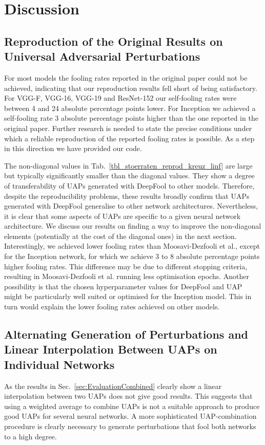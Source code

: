 \documentclass[runningheads]{llncs}
\begin{document}
\section{Discussion}\label{sec:Discussion}
\subsection{Reproduction of the Original Results on Universal Adversarial Perturbations}
For most models the fooling rates reported in the original paper could not be achieved, indicating that our reproduction results fell short of being satisfactory. For VGG-F, VGG-16, VGG-19 and ResNet-152 our self-fooling rates were between 4 and 24 absolute percentage points lower. For Inception we achieved a self-fooling rate 3 absolute percentage points higher than the one reported in the original paper. Further research is needed to state the precise conditions under which a reliable reproduction of the reported fooling rates is possible. As a step in this direction we have provided our code.

The non-diagonal values in Tab.~\ref{tbl_stoerraten_reprod_kreuz_linf} are large but typically significantly smaller than the diagonal values. They show a degree of transferability of UAPs generated with DeepFool to other models. Therefore, despite the reproducibility problems, these results broadly confirm that UAPs generated with DeepFool generalise to other network architectures. Nevertheless, it is clear that some aspects of UAPs are specific to a given neural network architecture. We discuss our results on finding a way to improve the non-diagonal elements (potentially at the cost of the diagonal ones) in the next section.
Interestingly, we achieved lower fooling rates than Moosavi-Dezfooli et al., except for the Inception network, for which we achieve 3 to 8 absolute percentage points higher fooling rates. This difference may be due to different stopping criteria, resulting in Moosavi-Dezfooli et al. running less optimisation epochs.
 Another possibility is that the chosen hyperparameter values for DeepFool and UAP might be particularly well suited or optimised for the Inception model. This in turn would explain the lower fooling rates achieved on other models.

\subsection{Alternating Generation of Perturbations and Linear Interpolation Be\-tween UAPs on Individual Networks}
As the results in Sec.~\ref{sec:EvaluationCombined} clearly show a linear interpolation between two UAPs does not give good results. This suggests that using a weighted average to combine UAPs is not a suitable approach to produce good UAPs for several neural networks. A more sophisticated UAP-combination procedure is clearly necessary to generate perturbations that fool both networks to a high degree.
\end{document}
